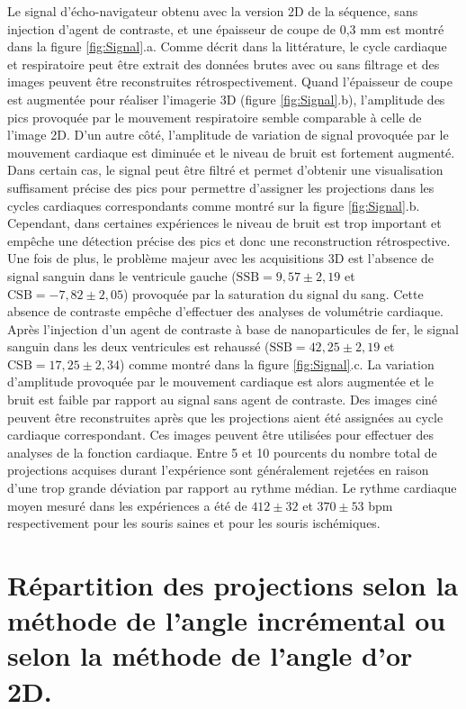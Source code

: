 Le signal d'écho-navigateur obtenu avec la version 2D de la séquence, sans injection d'agent de contraste, et une épaisseur de coupe de 0,3 mm est montré dans la figure \ref{fig:Signal}.a. Comme décrit dans la littérature, le cycle cardiaque et respiratoire peut être extrait des données brutes avec ou sans filtrage et des images peuvent être reconstruites rétrospectivement. Quand l'épaisseur de coupe est augmentée pour réaliser l'imagerie 3D (figure \ref{fig:Signal}.b), l'amplitude des pics provoquée par le mouvement respiratoire semble comparable à celle de l'image 2D. D'un autre côté, l'amplitude de variation de signal provoquée par le mouvement cardiaque est diminuée et le niveau de bruit est fortement augmenté. Dans certain cas, le signal peut être filtré et permet d'obtenir une visualisation suffisament précise des pics pour permettre d'assigner les projections dans les cycles cardiaques correspondants comme montré sur la figure \ref{fig:Signal}.b. Cependant, dans certaines expériences le niveau de bruit est trop important et empêche une détection précise des pics et donc une reconstruction rétrospective. Une fois de plus, le problème majeur avec les acquisitions 3D est l'absence de signal sanguin dans le ventricule gauche ($\text{SSB}= 9,57 \pm 2,19$ et $\text{CSB}= -7,82 \pm 2,05$) provoquée par la saturation du signal du sang. Cette absence de contraste empêche d'effectuer des analyses de volumétrie cardiaque.
Après l'injection d'un agent de contraste à base de nanoparticules de fer, le signal sanguin dans les deux ventricules est rehaussé ($\text{SSB}= 42,25 \pm 2,19$ et $\text{CSB}= 17,25 \pm 2,34$) comme montré dans la figure \ref{fig:Signal}.c. La variation d'amplitude provoquée par le mouvement cardiaque est alors augmentée et le bruit est faible par rapport au signal sans agent de contraste. Des images ciné peuvent être reconstruites après que les projections aient été assignées au cycle cardiaque correspondant. Ces images peuvent être utilisées pour effectuer des analyses de la fonction cardiaque. Entre 5 et 10  pourcents du nombre total de projections acquises durant l'expérience sont généralement rejetées en raison d'une trop grande déviation par rapport au rythme médian. Le rythme cardiaque moyen mesuré dans les expériences a été de $412 \pm 32$ et $370 \pm 53$ bpm respectivement pour les souris saines et pour les souris ischémiques.

\section{Répartition des projections selon la méthode de l'angle incrémental ou selon la méthode de l'angle d'or 2D.}

